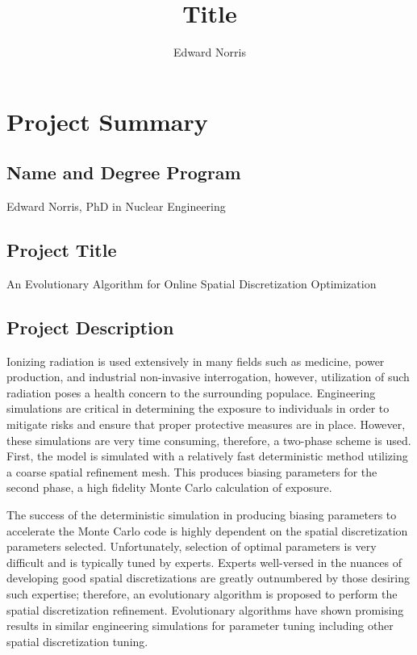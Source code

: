 \documentclass{article}
\begin{document}
\title{Title}
\author{Edward Norris}




\section{Project Summary}\label{sec:A}
\subsection{Name and Degree Program}\label{sec:a1}
Edward Norris, PhD in Nuclear Engineering

\subsection{Project Title}\label{sec:a2}
An Evolutionary Algorithm for Online Spatial Discretization Optimization

\subsection{Project Description}\label{sec:a3}
Ionizing radiation is used extensively in many fields such as medicine, power production, and industrial non-invasive interrogation, however, utilization of such radiation poses a health concern to the surrounding populace. Engineering simulations are critical in determining the exposure to individuals in order to mitigate risks and ensure that proper protective measures are in place. However, these simulations are very time consuming, therefore, a two-phase scheme is used. First, the model is simulated with a relatively fast deterministic method utilizing a coarse spatial refinement mesh. This produces biasing parameters for the second phase, a high fidelity Monte Carlo calculation of exposure.

The success of the deterministic simulation in producing biasing parameters to accelerate the Monte Carlo code is highly dependent on the spatial discretization parameters selected. Unfortunately, selection of optimal parameters is very difficult and is typically tuned by experts. Experts well-versed in the nuances of developing good spatial discretizations are greatly outnumbered by those desiring such expertise; therefore, an evolutionary algorithm is proposed to perform the spatial discretization refinement. Evolutionary algorithms have shown promising results in similar engineering simulations for parameter tuning including other spatial discretization tuning.
\end{document}
